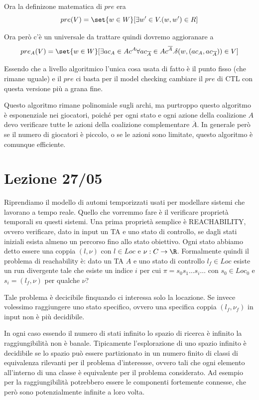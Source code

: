 Ora la definizone matematica di \(pre\) era
\[pre(V) = \set{w\in W}[\exists w' \in V. (w,w') \in R]\]

Ora però c'è un universale da trattare quindi dovremo aggioranare a 
\[pre_A(V) = \set{w\in W}[\exists {ac}_{A} \in Ac^A \forall {ac}_{\overline{A}} \in Ac^{\overline{A}}. \delta(w, ({ac}_A, {ac}_{\overline{A}})) \in V]\]

Essendo che a livello algoritmico l'unica cosa usata di fatto è il punto fisso (che rimane uguale) e il \(pre\) ci basta per il model checking cambiare il \(pre\) di CTL con questa versione più a grana fine.

Questo algoritmo rimane polinomiale sugli archi, ma purtroppo questo algoritmo è esponenziale nei giocatori, poiché per ogni stato e ogni azione della coalizione \(A\) devo verificare tutte le azioni della coalizione complementare \(\overline{A}\). In generale però se il numero di giocatori è piccolo, o se le azioni sono limitate, questo algoritmo è comunque efficiente.

\chapter{Lezione 27/05}

Riprendiamo il modello di automi temporizzati usati per modellare sistemi che lavorano a tempo reale. Quello che vorremmo fare è il verificare proprietà temporali su questi sistemi. Una prima proprietà semplice è REACHABILITY, ovvero verificare, dato in input un TA e uno stato di controllo, se dagli stati iniziali esista almeno un percorso fino allo stato obiettivo. Ogni stato abbiamo detto essere una coppia \((l,\nu)\) con \(l\in Loc\) e \(\nu: C \to \R\). Formalmente quindi il problema di reachability è: dato un TA \(A\) e uno stato di controllo \(l_f \in Loc\) esiste un run divergente tale che esiste un indice \(i\) per cui \(\pi = s_0 s_1 \ldots s_i \ldots\) con \(s_0 \in Loc_0\) e \(s_i = (l_f, \nu)\) per qualche \(\nu\)?

Tale problema è decicibile finquando ci interessa solo la locazione. Se invece volessimo raggiungere uno stato specifico, ovvero una specifica coppia \((l_f,\nu_f)\) in input non è più decidibile.

In ogni caso essendo il numero di stati infinito lo spazio di ricerca è infinito la raggiungibilità non è banale. Tipicamente l'esplorazione di uno spazio infinito è decidibile se lo spazio può essere partizionato in un numero finito di classi di equivalenza rilevanti per il problema d'interessse, ovvero tali che ogni elemento all'interno di una classe è equivalente per il problema considerato. Ad esempio per la raggiungibilità potrebbero essere le componenti fortemente connesse, che però sono potenzialmente infinite a loro volta.

